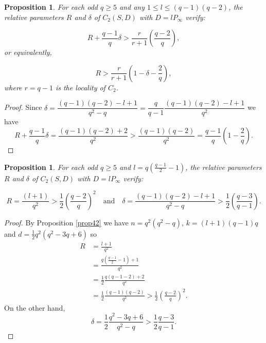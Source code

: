 \documentclass{amsart}
\newtheorem{pro}[thm]{Proposition}
\theoremstyle{definition}
\begin{document}
\begin{pro}\label{propcota} For each odd $q \geq 5$ and any $1 \leq l\leq  (q-1)(q-2)$, the relative parameters $R$ and $\delta$ of $C_2(S,D)$ with $D = l P_{\infty}$ verify:
	
$$ R + \frac{q-1}{q} \delta > \frac{r}{r+1} \left( \frac{q-2}{q} \right),$$ or equivalently,

\begin{equation}\label{cotanuestra}
	R > \frac{r}{r+1} \left( 1 - \delta - \frac{2}{q} \right),
\end{equation} where $r = q-1$ is the locality of $C_2$.
\end{pro}

\begin{proof}
	Since $\delta = \dfrac{(q-1)(q-2)-l+1}{q^2-q} = \dfrac{q}{q-1} \dfrac{(q-1)(q-2)-l+1}{q^2}$ we have $$R + \frac{q-1}{q} \delta = \frac{(q-1)(q-2)+2}{q^2} > \frac{(q-1)(q-2)}{q^2} = \frac{q-1}{q} \left( 1 - \frac{2}{q} \right).$$ 
\end{proof}
 
 
\begin{pro}\label{propejemplo}
	For each odd $q \geq 5$ and $l = q \left(\frac{q-1}{2}-1 \right)$, the relative parameters $R$ and $\delta$ of $C_2(S,D)$ with $D = l P_{\infty}$ verify:
	
	\begin{equation}\label{parametrosnuestros} R= \frac{(l+1)}{q^2} > \frac{1}{2}\left( \frac{q-2}{q} \right)^2  \quad \text{and} \quad \delta = \frac{(q-1)(q-2)-l+1}{q^2-q} > \frac{1}{2} \left( \frac{q-3}{q-1} \right). \end{equation}
\end{pro}

\begin{proof}
	By Proposition \ref{prop42} we have  $n = q^2(q^2-q)$, $k = (l+1)(q-1)q$ and $d = \frac{1}{2}q^2(q^2-3q+6)$ so
	\begin{align*} R &= \frac{l+1}{q^2}  \\
		& = \frac{q \left(\frac{q-1}{2} -1 \right)+1}{q^2} \\
		& = \frac{1}{2} \frac{q (q-1-2)+2}{q^2} \\
		& = \frac{1}{2} \frac{(q-1)(q-2)}{q^2}  > \frac{1}{2} \left( \frac{q-2}{q} \right)^2.
	\end{align*}
On the other hand, 	$$\delta = \frac{1}{2}\frac{q^2-3q+6}{q^2-q} > \frac{1}{2}\frac{q-3}{q-1}.$$

\end{proof}
\end{document}
